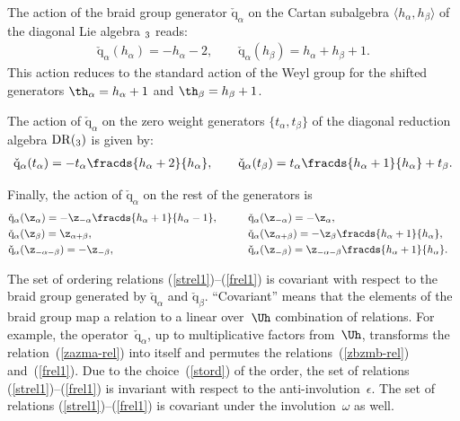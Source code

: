 \documentclass[pdftex]{sigma}
\def\a{\alpha}\def\Ar{{\rm A}}\def\Ab{\bar{\rm A}}\def\b{\beta}\def\bb{\mathfrak{b}}
\def\q{\check{\mathrm q}}\def\Q{\mathrm{Q}}\def\r#1{(\ref{#1})}\let\rf=\r
\numberwithin{equation}{section}
\begin{document}
The action of the braid group generator $\q_\a$ on the Cartan subalgebra $\langle h_\a ,h_\b\rangle$ of the diagonal Lie algebra
$\sl_3$ reads:
\begin{gather} \label{ssnaq1}
\q_\a (h_\a )=-h_\a -2 ,\qquad \q_\a (h_\b )=h_\a +h_\b +1 .
\end{gather}
This action reduces to the standard action of the Weyl group for the shifted generators $\th_\a =h_\a +1$ and $\th_\b=h_\b +1$.


The action of $\q_\a$ on the zero weight generators  $\{ t_\a ,t_\b\}$ of the diagonal reduction algebra ${\mathrm{DR}}(\sl_3)$ is given by:
\begin{gather}\label{ssnaq2}
\q_\a (t_\a )=-t_\a  \fracds{h_\a +2}{h_\a},\qquad
\q_\a (t_\b )  = t_\a  \fracds{h_\a +1}{h_\a}+t_\b   .
\end{gather}

Finally, the action of $\q_\a$ on the rest of the generators is
\begin{alignat}{3}
&\q_\a (\z_{\a} )=-\z_{-\a} \fracds{h_\a +1}{h_\a -1} ,\qquad && \q_\a (\z_{-\a} )=-\z_{\a} ,&\nonumber\\
& \q_\a (\z_{\b} )=\z_{\a +\b} ,\qquad && \q_\a (\z_{\a +\b} )=-\z_\b \fracds{h_\a +1}{h_\a} ,& \label{ssnaq3}\\
& \q_\a (\z_{-\a -\b} )=-\z_{-\b},\qquad && \q_\a (\z_{-\b} )=\z_{-\a -\b} \fracds{h_\a +1}{h_\a} .\nonumber
\end{alignat}

The set of ordering relations \rf{strel1}--\rf{frel1} is covariant with respect to the braid group generated by $\q_\a$ and $\q_\b$. ``Covariant'' means
that the elements of the braid group map a relation to a linear over~$\Uh$ combination of relations. For example, the operator~$\q_\a$, up to multiplicative factors
from~$\Uh$, transforms the relation~\rf{zazma-rel} into itself and permutes the relations~\rf{zbzmb-rel} and~\rf{frel1}. Due to the choice~\rf{stord} of the order,
the set of relations \rf{strel1}--\rf{frel1} is invariant with respect to the anti-involution~$\epsilon$. The set of relations \rf{strel1}--\rf{frel1} is covariant under the
involution~$\omega$ as well.
\end{document}
